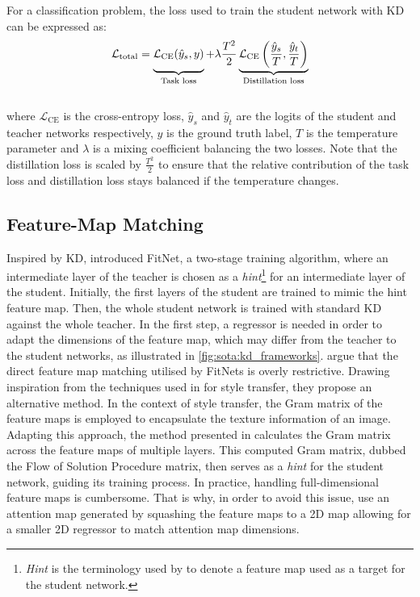 For a classification problem, the loss used to train the student network with
\ac{KD} can be expressed as:\\

\begin{equation}
  \mathcal{L}_{\text{total}} = \underbrace{\mathcal{L}_{\text{CE}}(\hat{y}_{s}, y)\vphantom{\left(\frac{\hat{y}_{s}}{T}, \frac{\hat{y}_{t}}{T}\right)}}_{\text{Task loss}} +
  \lambda \frac{T^{2}}{2}\underbrace{\mathcal{L}_{\text{CE}}\left(\frac{\hat{y}_{s}}{T}, \frac{\hat{y}_{t}}{T}\right)}_{\text{Distillation loss}}
\end{equation}
\\

\noindent where $\mathcal{L}_{\text{CE}}$ is the cross-entropy loss,
$\hat{y}_{s}$ and $\hat{y}_{t}$ are the logits of the student and teacher
networks respectively, $y$ is the ground truth label, $T$ is the temperature
parameter and $\lambda$ is a mixing coefficient balancing the two losses. Note
that the distillation loss is scaled by $\frac{T^2}{2}$ to ensure that the
relative contribution of the task loss and distillation loss stays balanced if
the temperature changes.\\

\subsection{Feature-Map Matching}
Inspired by \ac{KD}, \cite{DBLP:journals/corr/RomeroBKCGB14} introduced FitNet,
a two-stage training algorithm, where an intermediate layer of the teacher is
chosen as a \emph{hint}\footnote{\emph{Hint} is the terminology used by
  \citeauthor{DBLP:journals/corr/RomeroBKCGB14}
  \cite{DBLP:journals/corr/RomeroBKCGB14} to denote a feature map used as a
  target for the student network.} for an intermediate layer of the student.
  Initially, the first layers of the student are trained to mimic the hint
  feature map. Then, the whole student network is trained with standard \ac{KD}
  against the whole teacher. In the first step, a regressor is needed in order
  to adapt the dimensions of the feature map, which may differ from the teacher
  to the student networks, as illustrated in \cref{fig:sota:kd_frameworks}.
  \citeauthor{DBLP:conf/cvpr/YimJBK17} argue that the direct feature map
  matching utilised by FitNets is overly restrictive. Drawing inspiration from
  the techniques used in \cite{DBLP:journals/corr/GatysEB15a} for style
  transfer, they propose an alternative method. In the context of style
  transfer, the Gram matrix of the feature maps is employed to encapsulate the
  texture information of an image. Adapting this approach, the method presented
  in \cite{DBLP:conf/cvpr/YimJBK17} calculates the Gram matrix across the
  feature maps of multiple layers. This computed Gram matrix, dubbed the Flow of
  Solution Procedure matrix, then serves as a \emph{hint} for the student
  network, guiding its training process. In practice, handling full-dimensional
  feature maps is cumbersome. That is why, in order to avoid this issue,
  \cite{DBLP:conf/iclr/ZagoruykoK17} use an attention map generated by squashing
  the feature maps to a 2D map allowing for a smaller 2D regressor to match
  attention map dimensions.\\

